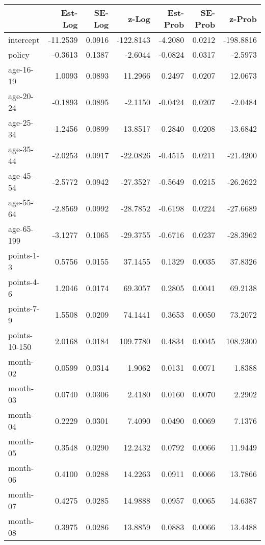 \documentclass[10pt]{article}
\begin{document}

\begin{table}[ht]
\centering
\begin{tabular}{lrrrrrr}
  \hline
 & Est-Log & SE-Log & z-Log & Est-Prob & SE-Prob & z-Prob \\ 
  \hline
intercept & -11.2539 & 0.0916 & -122.8143 & -4.2080 & 0.0212 & -198.8816 \\ 
  policy & -0.3613 & 0.1387 & -2.6044 & -0.0824 & 0.0317 & -2.5973 \\ 
  age-16-19 & 1.0093 & 0.0893 & 11.2966 & 0.2497 & 0.0207 & 12.0673 \\ 
  age-20-24 & -0.1893 & 0.0895 & -2.1150 & -0.0424 & 0.0207 & -2.0484 \\ 
  age-25-34 & -1.2456 & 0.0899 & -13.8517 & -0.2840 & 0.0208 & -13.6842 \\ 
  age-35-44 & -2.0253 & 0.0917 & -22.0826 & -0.4515 & 0.0211 & -21.4200 \\ 
  age-45-54 & -2.5772 & 0.0942 & -27.3527 & -0.5649 & 0.0215 & -26.2622 \\ 
  age-55-64 & -2.8569 & 0.0992 & -28.7852 & -0.6198 & 0.0224 & -27.6689 \\ 
  age-65-199 & -3.1277 & 0.1065 & -29.3755 & -0.6716 & 0.0237 & -28.3962 \\ 
  points-1-3 & 0.5756 & 0.0155 & 37.1455 & 0.1329 & 0.0035 & 37.8326 \\ 
  points-4-6 & 1.2046 & 0.0174 & 69.3057 & 0.2805 & 0.0041 & 69.2138 \\ 
  points-7-9 & 1.5508 & 0.0209 & 74.1441 & 0.3653 & 0.0050 & 73.2072 \\ 
  points-10-150 & 2.0168 & 0.0184 & 109.7780 & 0.4834 & 0.0045 & 108.2300 \\ 
  month-02 & 0.0599 & 0.0314 & 1.9062 & 0.0131 & 0.0071 & 1.8388 \\ 
  month-03 & 0.0740 & 0.0306 & 2.4180 & 0.0160 & 0.0070 & 2.2902 \\ 
  month-04 & 0.2229 & 0.0301 & 7.4090 & 0.0490 & 0.0069 & 7.1376 \\ 
  month-05 & 0.3548 & 0.0290 & 12.2432 & 0.0792 & 0.0066 & 11.9449 \\ 
  month-06 & 0.4100 & 0.0288 & 14.2263 & 0.0911 & 0.0066 & 13.7866 \\ 
  month-07 & 0.4275 & 0.0285 & 14.9888 & 0.0957 & 0.0065 & 14.6387 \\ 
  month-08 & 0.3975 & 0.0286 & 13.8859 & 0.0883 & 0.0066 & 13.4488 \\ 

\end{tabular}
\end{table}
\end{document}
